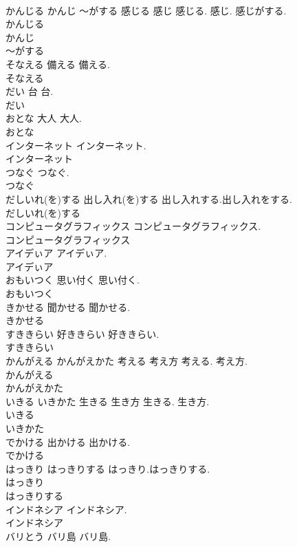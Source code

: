\documentclass[8pt]{extreport}
\begin{document}
\begin{CJK}{UTF8}{min}
\\	かんじる かんじ ～がする	感じる 感じ	感じる. 感じ. 感じがする.	
\\	かんじる
\\	かんじ
\\	～がする
\\	そなえる	備える	備える.	
\\	そなえる
\\	だい	台	台.	
\\	だい
\\	おとな	大人	大人.	
\\	おとな
\\	インターネット		インターネット.	
\\	インターネット
\\	つなぐ		つなぐ.	
\\	つなぐ
\\	だしいれ(を)する	出し入れ(を)する	出し入れする.出し入れをする.	
\\	だしいれ(を)する
\\	コンピュータグラフィックス		コンピュータグラフィックス.	
\\	コンピュータグラフィックス
\\	アイデぃア		アイデぃア.	
\\	アイデぃア
\\	おもいつく	思い付く	思い付く.	
\\	おもいつく
\\	きかせる	聞かせる	聞かせる.	
\\	きかせる
\\	すききらい	好ききらい	好ききらい.	
\\	すききらい
\\	かんがえる かんがえかた	考える 考え方	考える. 考え方.	
\\	かんがえる
\\	かんがえかた
\\	いきる いきかた	生きる 生き方	生きる. 生き方.	
\\	いきる
\\	いきかた
\\	でかける	出かける	出かける.	
\\	でかける
\\	はっきり はっきりする		はっきり.はっきりする.	
\\	はっきり
\\	はっきりする
\\	インドネシア		インドネシア.	
\\	インドネシア
\\	バリとう	バリ島	バリ島.	

\end{CJK}
\end{document}
